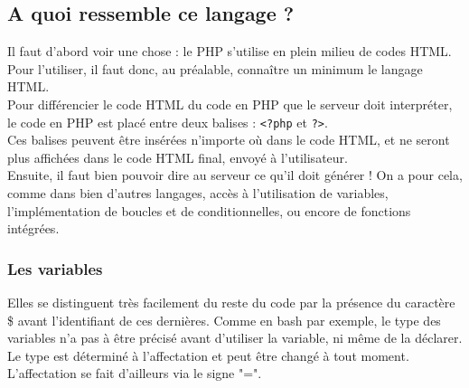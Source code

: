 \documentclass{article}
\begin{document}
\subsection{A quoi ressemble ce langage ?}
Il faut d'abord voir une chose : le PHP s'utilise en plein milieu de codes HTML. Pour l'utiliser, il faut donc, au préalable, connaître un minimum le langage HTML. \\
Pour différencier le code HTML du code en PHP que le serveur doit interpréter, le code en PHP est placé entre deux balises : \texttt{<?php} et \texttt{?>}.\\
Ces balises peuvent être insérées n'importe où dans le code HTML, et ne seront plus affichées dans le code HTML final, envoyé à l'utilisateur. \\

\bigskip
Ensuite, il faut bien pouvoir dire au serveur ce qu'il doit générer ! On a pour cela, comme dans bien d'autres langages, accès à l'utilisation de variables, l'implémentation de boucles et de conditionnelles, ou encore de fonctions intégrées. \\

\subsubsection{Les variables}
Elles se distinguent très facilement du reste du code par la présence du caractère \$ avant l'identifiant de ces dernières. Comme en bash par exemple, le type des variables n'a pas à être précisé avant d'utiliser la variable, ni même de la déclarer. Le type est déterminé à l'affectation et peut être changé à tout moment. \\
L'affectation se fait d'ailleurs via le signe "=". 
\end{document}
